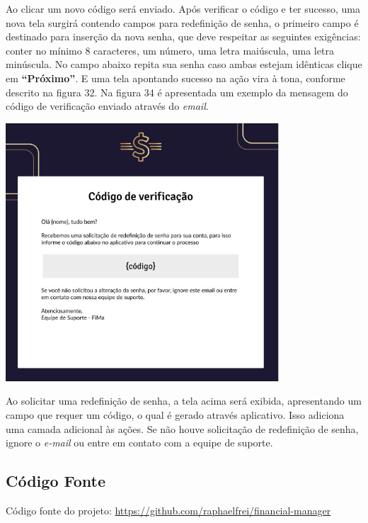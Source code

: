 Ao clicar um novo código será enviado. Após verificar o código e ter sucesso, uma nova tela surgirá contendo campos para redefinição de senha, o primeiro campo é destinado para inserção da nova senha, que deve respeitar as seguintes exigências: conter no mínimo 8 caracteres, um número, uma letra maiúscula, uma letra minúscula. No campo abaixo repita sua senha caso ambas estejam idênticas clique em \textbf{“Próximo”}. E uma tela apontando sucesso na ação vira à tona, conforme descrito na figura 32. Na figura 34 é apresentada um exemplo da mensagem do código de verificação enviado através do \textit{email}.

    \vspace{\baselineskip}
    \begin{center}
        \begin{minipage}{\textwidth}
            \centering
            \includegraphics[scale=0.6]{figs/img_6_1.png}
            \label{fig:figura33}
        \end{minipage}
    \end{center}   

Ao solicitar uma redefinição de senha, a tela acima será exibida, apresentando um campo que requer um código, o qual é gerado através aplicativo. Isso adiciona uma camada adicional às ações. Se não houve solicitação de redefinição de senha, ignore o \textit{e-mail} ou entre em contato com a equipe de suporte.

\subsection{Código Fonte}

Código fonte do projeto: \href{https://github.com/raphaelfrei/financial-manager}{https://github.com/raphaelfrei/financial-manager}